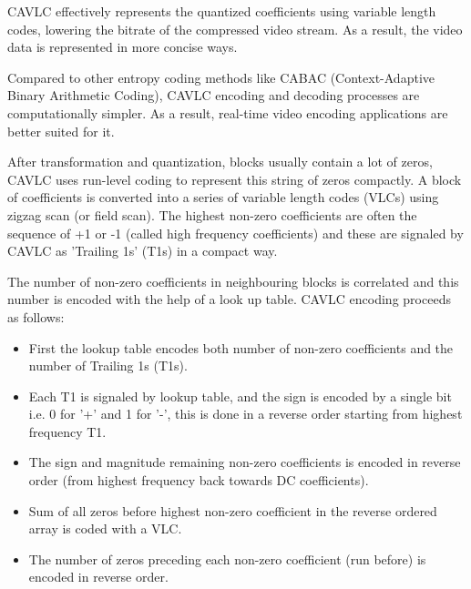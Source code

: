 CAVLC effectively represents the quantized coefficients using variable length codes, lowering the bitrate of the compressed video stream. As a result, the video data is represented in more concise ways.

Compared to other entropy coding methods like CABAC (Context-Adaptive Binary Arithmetic Coding), CAVLC encoding and decoding processes are computationally simpler. As a result, real-time video encoding applications are better suited for it.

After transformation and quantization, blocks usually contain a lot of zeros, CAVLC uses run-level coding to represent this string of zeros compactly. A block of coefficients is converted into a series of variable length codes (VLCs) using zigzag scan (or field scan). The highest non-zero coefficients are often the sequence of +1 or -1 (called high frequency coefficients) and these are signaled by CAVLC as 'Trailing 1s' (T1s) in a compact way.

The number of non-zero coefficients in neighbouring blocks is correlated and this number is encoded with the help of a look up table. CAVLC encoding proceeds as follows:
\begin{itemize}
	\item First the lookup table encodes both number of non-zero coefficients and the number of Trailing 1s (T1s).
	\item Each T1 is signaled by lookup table, and the sign is encoded by a single bit i.e. 0 for '+' and 1 for '-', this is done in a reverse order starting from highest frequency T1.
	\item The sign and magnitude remaining non-zero coefficients is encoded in reverse order (from highest frequency back towards DC coefficients).
	\item Sum of all zeros before highest non-zero coefficient in the reverse ordered array is coded with a VLC.
	\item The number of zeros preceding each non-zero coefficient (run before) is encoded in reverse
	order.
\end{itemize}